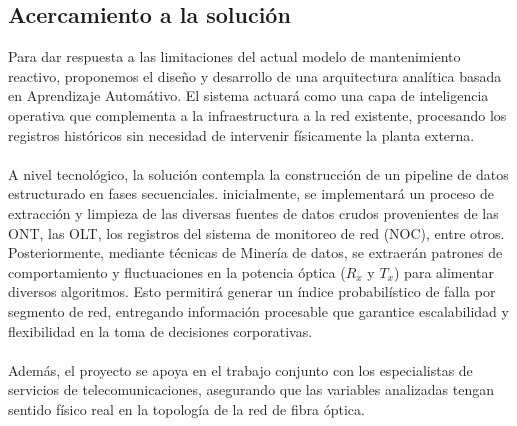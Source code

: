 \documentclass[12pt,a4paper]{article}
\begin{document}
    \subsection{Acercamiento a la solución}
    \noindent
    Para dar respuesta a las limitaciones del actual modelo de mantenimiento reactivo, proponemos el diseño y desarrollo de una arquitectura analítica basada en Aprendizaje Automátivo. El sistema actuará como una capa
    de inteligencia operativa que complementa a la infraestructura a la red existente, procesando los registros históricos sin necesidad de intervenir físicamente la planta externa.\\\\

    \noindent
    A nivel tecnológico, la solución contempla la construcción de un pipeline de datos estructurado en fases secuenciales. inicialmente, se implementará un proceso de extracción y limpieza de las diversas fuentes de datos crudos
    provenientes de las ONT, las OLT, los registros del sistema de monitoreo de red (NOC), entre otros. Posteriormente, mediante técnicas de Minería de datos, se extraerán patrones de comportamiento y
    fluctuaciones en la potencia óptica ($R_x$ y $T_x$) para alimentar diversos algoritmos. Esto permitirá generar un índice probabilístico de falla por segmento de red, entregando información procesable que garantice escalabilidad y flexibilidad
    en la toma de decisiones corporativas.\\\\
    
    
    \noindent
    Además, el proyecto se apoya en el trabajo conjunto con los especialistas de servicios de telecomunicaciones, asegurando que las variables analizadas tengan sentido físico real en la topología de la red de fibra óptica.\\\\
\end{document}
